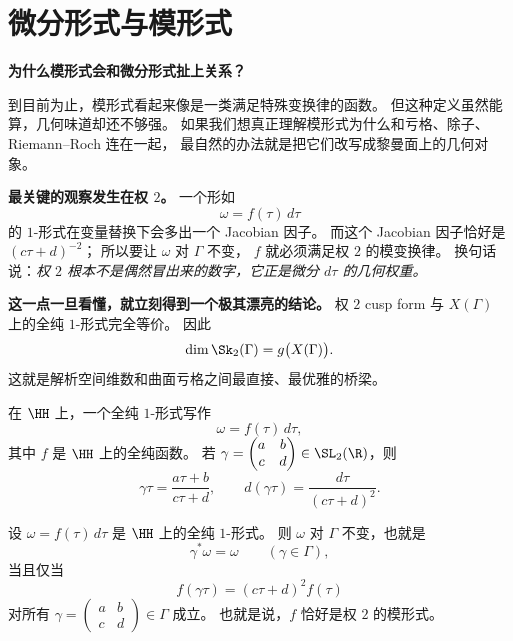 \section{微分形式与模形式}
\label{sec:differentials-and-modforms}
\label{sec:modular-forms-differentials}

\textbf{为什么模形式会和微分形式扯上关系？}

到目前为止，模形式看起来像是一类满足特殊变换律的函数。
但这种定义虽然能算，几何味道却还不够强。
如果我们想真正理解模形式为什么和亏格、除子、Riemann--Roch 连在一起，
最自然的办法就是把它们改写成黎曼面上的几何对象。

\textbf{最关键的观察发生在权 $2$。}
一个形如
\[
  \omega=f(\tau)\,d\tau
\]
的 $1$-形式在变量替换下会多出一个 Jacobian 因子。
而这个 Jacobian 因子恰好是 $(c\tau+d)^{-2}$；
所以要让 $\omega$ 对 $\Gamma$ 不变，
$f$ 就必须满足权 $2$ 的模变换律。
换句话说：\emph{权 $2$ 根本不是偶然冒出来的数字，它正是微分 $d\tau$ 的几何权重。}

\textbf{这一点一旦看懂，就立刻得到一个极其漂亮的结论。}
权 $2$ cusp form 与 $X(\Gamma)$ 上的全纯 $1$-形式完全等价。
因此
\[
  \dim \Sk_2(\Gamma)=g\bigl(X(\Gamma)\bigr).
\]
这就是解析空间维数和曲面亏格之间最直接、最优雅的桥梁。

\begin{definition}[上半平面上的 $1$-形式]
\label{def:one-form-on-h}
在 $\HH$ 上，一个全纯 $1$-形式写作
\[
  \omega=f(\tau)\,d\tau,
\]
其中 $f$ 是 $\HH$ 上的全纯函数。
若 $\gamma=\begin{pmatrix}a&b\\c&d\end{pmatrix}\in\SL_2(\R)$，则
\[
  \gamma\tau=\frac{a\tau+b}{c\tau+d},
  \qquad
  d(\gamma\tau)=\frac{d\tau}{(c\tau+d)^2}.
\]
\end{definition}

\begin{proposition}[下降到商空间的条件]
\label{prop:descent-weight-2}
设 $\omega=f(\tau)\,d\tau$ 是 $\HH$ 上的全纯 $1$-形式。
则 $\omega$ 对 $\Gamma$ 不变，也就是
\[
  \gamma^*\omega=\omega \qquad (\gamma\in\Gamma),
\]
当且仅当
\[
  f(\gamma\tau)=(c\tau+d)^2f(\tau)
\]
对所有 $\gamma=\begin{pmatrix}a&b\\c&d\end{pmatrix}\in\Gamma$ 成立。
也就是说，$f$ 恰好是权 $2$ 的模形式。
\end{proposition}

